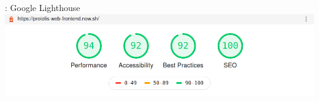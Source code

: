     \begin{frame}{\insertsectionhead}{\insertsubsectionhead{}: Google Lighthouse}
      \centering
      \includegraphics[width=\textwidth]{../res/tests/Screenshot_2020-03-04 Lighthouse Report Viewer.png}
    \end{frame}
